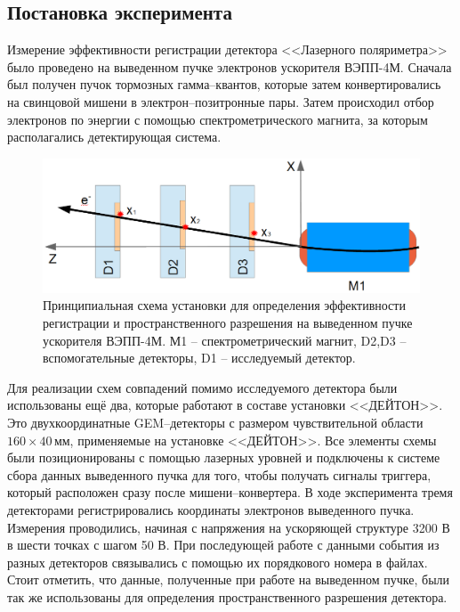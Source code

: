 \subsection{Постановка эксперимента}
Измерение эффективности регистрации детектора <<Лазерного поляриметра>> было проведено на выведенном пучке электронов ускорителя ВЭПП-4М. Сначала был получен пучок тормозных гамма--квантов, которые затем конвертировались на свинцовой мишени в электрон--позитронные пары. Затем происходил отбор электронов по энергии с помощью спектрометрического магнита, за которым располагались детектирующая система.
 \begin{figure}[h]
 	\centering
 	\includegraphics[width= 12cm]{img/reg_eff_exp_scheme.png}
 	\caption{Принципиальная схема установки для определения эффективности регистрации и пространственного разрешения на выведенном пучке ускорителя ВЭПП-4М. М1 -- спектрометрический магнит, D2,D3 -- вспомогательные детекторы, D1 -- исследуемый детектор.}
 	\label{fig:test_beam_scheme}
 \end{figure}
Для реализации схем совпадений помимо исследуемого детектора были использованы ещё два, которые работают в составе установки <<ДЕЙТОН>>. Это двухкоординатные GEM--детекторы с размером чувствительной области $160 \times 40$\,мм, применяемые на установке <<ДЕЙТОН>>. Все элементы схемы были позиционированы с помощью лазерных уровней и подключены к системе сбора данных выведенного пучка для того, чтобы получать сигналы триггера, который расположен сразу после мишени--конвертера. В ходе эксперимента тремя детекторами регистрировались координаты электронов выведенного пучка. Измерения проводились, начиная с напряжения на ускоряющей структуре 3200 В в шести точках с шагом 50 В. При последующей работе с данными события из разных детекторов связывались с помощью их порядкового номера в файлах. Стоит отметить, что данные, полученные при работе на выведенном пучке, были так же использованы для определения пространственного разрешения детектора. 

